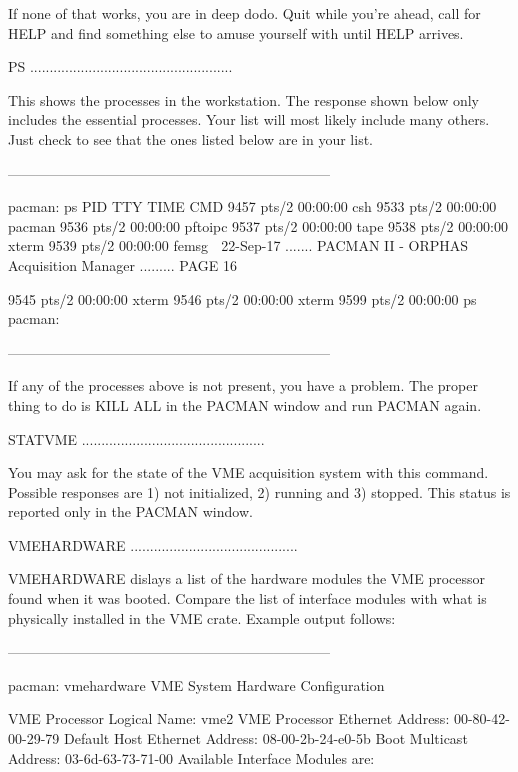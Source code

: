    If none of that works, you are in deep dodo.  Quit while you're ahead, call
   for HELP and find something else to amuse yourself with until HELP arrives.
 
   PS ....................................................
 
   This  shows  the  processes  in  the workstation.  The response shown below
   only includes the essential processes.  Your list will most  likely include
   many  others.   Just  check  to  see that the ones listed below are in your
   list.
 
     ---------------------------------------------------------------------
 
   pacman: ps
     PID TTY          TIME CMD
    9457 pts/2    00:00:00 csh
    9533 pts/2    00:00:00 pacman
    9536 pts/2    00:00:00 pftoipc
    9537 pts/2    00:00:00 tape
    9538 pts/2    00:00:00 xterm
    9539 pts/2    00:00:00 femsg
    
   22-Sep-17 ....... PACMAN II - ORPHAS Acquisition Manager ......... PAGE  16
 
    9545 pts/2    00:00:00 xterm
    9546 pts/2    00:00:00 xterm
    9599 pts/2    00:00:00 ps
   pacman:
 
     ---------------------------------------------------------------------
 
   If any of the processes above is not present,  you  have  a  problem.   The
   proper thing to do is KILL ALL in the PACMAN window and run PACMAN again.
 
   STATVME ...............................................
 
   You  may ask for the state of the VME acquisition system with this command.
   Possible responses are 1) not initialized, 2) running and 3) stopped.  This
   status is reported only in the PACMAN window.
 
   VMEHARDWARE ...........................................
 
   VMEHARDWARE  dislays a list of the hardware modules the VME processor found
   when it was booted.  Compare the list of  interface  modules  with  what is
   physically installed in the VME crate. Example output follows:
 
     ---------------------------------------------------------------------
 
   pacman: vmehardware
   VME System Hardware Configuration
 
       VME Processor Logical Name: vme2
   VME Processor Ethernet Address: 00-80-42-00-29-79
    Default Host Ethernet Address: 08-00-2b-24-e0-5b
           Boot Multicast Address: 03-6d-63-73-71-00
   Available Interface Modules are:
 
